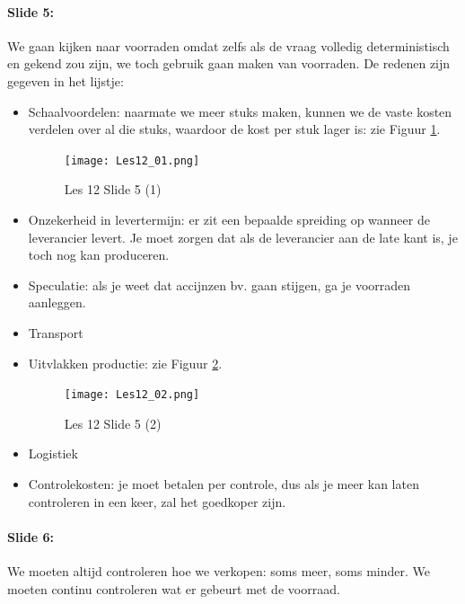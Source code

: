 \documentclass[10pt,a4paper]{report}
\begin{document}
\paragraph{Slide 5:} We gaan kijken naar voorraden omdat zelfs als de vraag volledig deterministisch en gekend zou zijn, we toch gebruik gaan maken van voorraden. De redenen zijn gegeven in het lijstje:
\begin{itemize}
\item Schaalvoordelen: naarmate we meer stuks maken, kunnen we de vaste kosten verdelen over al die stuks, waardoor de kost per stuk lager is: zie Figuur \ref{les12_01}.

\begin{figure}[h!]
\centering
\texttt{[image: Les12\_01.png]}
\caption{Les 12 Slide 5 (1)} 
\label{les12_01}
\end{figure}	
	
\item Onzekerheid in levertermijn: er zit een bepaalde spreiding op wanneer de leverancier levert. Je moet zorgen dat als de leverancier aan de late kant is, je toch nog kan produceren.
\item Speculatie: als je weet dat accijnzen bv. gaan stijgen, ga je voorraden aanleggen.
\item Transport
\item Uitvlakken productie: zie Figuur \ref{les12_02}.

\begin{figure}[h!]
\centering
\texttt{[image: Les12\_02.png]}
\caption{Les 12 Slide 5 (2)} 
\label{les12_02}
\end{figure}

\item Logistiek
\item Controlekosten: je moet betalen per controle, dus als je meer kan laten controleren in een keer, zal het goedkoper zijn.
\end{itemize}

\paragraph{Slide 6:} We moeten altijd controleren hoe we verkopen: soms meer, soms minder. We moeten continu controleren wat er gebeurt met de voorraad. 
\end{document}
